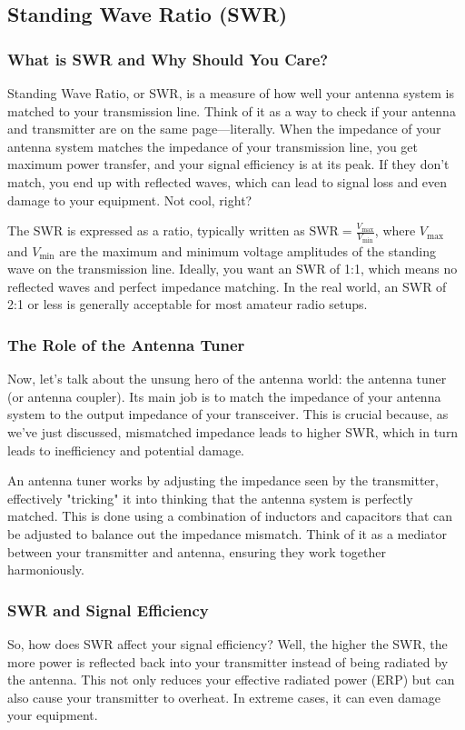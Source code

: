 \subsection{Standing Wave Ratio (SWR)}
\label{subsec:standing-wave}

\subsubsection*{What is SWR and Why Should You Care?}
Standing Wave Ratio, or SWR, is a measure of how well your antenna system is matched to your transmission line. Think of it as a way to check if your antenna and transmitter are on the same page—literally. When the impedance of your antenna system matches the impedance of your transmission line, you get maximum power transfer, and your signal efficiency is at its peak. If they don’t match, you end up with reflected waves, which can lead to signal loss and even damage to your equipment. Not cool, right?

The SWR is expressed as a ratio, typically written as \( \text{SWR} = \frac{V_{\text{max}}}{V_{\text{min}}} \), where \( V_{\text{max}} \) and \( V_{\text{min}} \) are the maximum and minimum voltage amplitudes of the standing wave on the transmission line. Ideally, you want an SWR of 1:1, which means no reflected waves and perfect impedance matching. In the real world, an SWR of 2:1 or less is generally acceptable for most amateur radio setups.

\subsubsection*{The Role of the Antenna Tuner}
Now, let’s talk about the unsung hero of the antenna world: the antenna tuner (or antenna coupler). Its main job is to match the impedance of your antenna system to the output impedance of your transceiver. This is crucial because, as we’ve just discussed, mismatched impedance leads to higher SWR, which in turn leads to inefficiency and potential damage.

An antenna tuner works by adjusting the impedance seen by the transmitter, effectively "tricking" it into thinking that the antenna system is perfectly matched. This is done using a combination of inductors and capacitors that can be adjusted to balance out the impedance mismatch. Think of it as a mediator between your transmitter and antenna, ensuring they work together harmoniously.

\subsubsection*{SWR and Signal Efficiency}
So, how does SWR affect your signal efficiency? Well, the higher the SWR, the more power is reflected back into your transmitter instead of being radiated by the antenna. This not only reduces your effective radiated power (ERP) but can also cause your transmitter to overheat. In extreme cases, it can even damage your equipment. 

